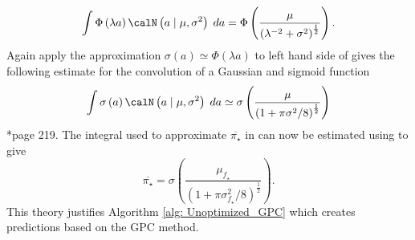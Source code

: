 \begin{equation} \label{eq: probit-int-apprx-1}
    \int \Phi \left( \lambda a \right) \calN \left( a \mid \mu , \sigma^2 \right) \; da = \Phi \left( \frac{\mu}{\left( \lambda^{-2} + \sigma^2 \right)^{\frac{1}{2}}} \right).
\end{equation}
Again apply the approximation $\sigma \left( a \right) \simeq \Phi \left( \lambda a \right)$ to left hand side of   gives the following estimate for the convolution of a Gaussian and sigmoid function
\begin{equation} \label{eq: pred-apprx-2}
    \int \sigma \left( a \right) \calN \left( a \mid \mu , \sigma^2 \right) \; da \simeq \sigma \left( \frac{\mu}{\left( 1 + \pi \sigma^2 / 8 \right)^{\frac{1}{2}}} \right)
\end{equation}
\cite{BishopChristopherM2006Pram}*{page 219}. The integral used to approximate $\overline{\pi_{\star}}$ in   can now be estimated using   to give
\begin{equation*} \label{eq: pred-apprx-3}
    \overline{\pi_{\star}} = \sigma \left( \frac{\mu_{f_{\star}}}{\left( 1 + \pi \sigma_{f_{\star}}^2 / 8 \right)^{\frac{1}{2}}} \right).
\end{equation*}
This theory justifies Algorithm \ref{alg: Unoptimized_GPC} which creates predictions based on the GPC method.

